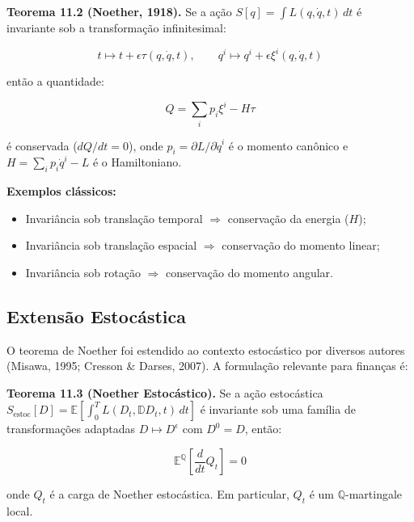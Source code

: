\smallskip
\noindent\textbf{Teorema 11.2 (Noether, 1918).} Se a a\c{c}\~ao $S[q] = \int L(q,\dot{q},t)\,dt$ \'e invariante sob a transforma\c{c}\~ao infinitesimal:

\begin{equation}\label{eq:transformacao-noether}
t \mapsto t + \epsilon \tau(q,\dot{q},t), \qquad q^i \mapsto q^i + \epsilon \xi^i(q,\dot{q},t)
\end{equation}

ent\~ao a quantidade:

\begin{equation}\label{eq:carga-noether}
Q = \sum_i p_i \xi^i - H\tau
\end{equation}

\'e conservada ($dQ/dt = 0$), onde $p_i = \partial L/\partial \dot{q}^i$ \'e o momento can\^onico e $H = \sum_i p_i \dot{q}^i - L$ \'e o Hamiltoniano.

\smallskip
\noindent\textbf{Exemplos cl\'assicos:}
\begin{itemize}
 \item Invari\^ancia sob transla\c{c}\~ao temporal $\Rightarrow$ conserva\c{c}\~ao da energia ($H$);
 \item Invari\^ancia sob transla\c{c}\~ao espacial $\Rightarrow$ conserva\c{c}\~ao do momento linear;
 \item Invari\^ancia sob rota\c{c}\~ao $\Rightarrow$ conserva\c{c}\~ao do momento angular.
\end{itemize}

\subsection{Extens\~ao Estoc\'astica}

O teorema de Noether foi estendido ao contexto estoc\'astico por diversos autores (Misawa, 1995; Cresson \& Darses, 2007). A formula\c{c}\~ao relevante para finan\c{c}as \'e:

\smallskip
\noindent\textbf{Teorema 11.3 (Noether Estoc\'astico).} Se a a\c{c}\~ao estoc\'astica $S_{\text{estoc}}[D] = \mathbb{E}[\int_0^T L(D_t, \mathbb{D}D_t, t)\,dt]$ \'e invariante sob uma fam\'ilia de transforma\c{c}\~oes adaptadas $D \mapsto D^\epsilon$ com $D^0 = D$, ent\~ao:

\begin{equation}\label{eq:carga-noether-estocastica}
\mathbb{E}^{\mathbb{Q}}\left[ \frac{d}{dt} Q_t \right] = 0
\end{equation}

onde $Q_t$ \'e a carga de Noether estoc\'astica. Em particular, $Q_t$ \'e um $\mathbb{Q}$-martingale local.

